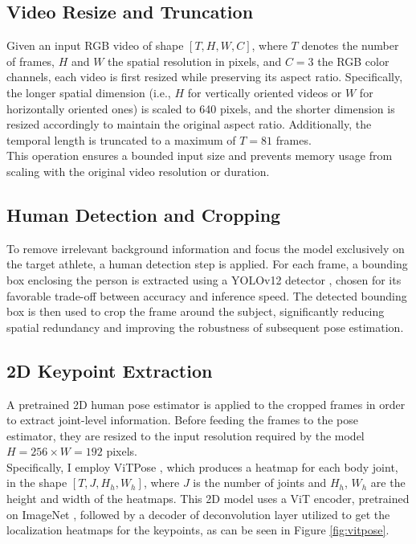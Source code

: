 \subsection{Video Resize and Truncation}
Given an input RGB video of shape $[T, H, W, C]$, where $T$ denotes the number of frames, $H$ and $W$ the spatial resolution in pixels, and $C=3$ the RGB color channels, each video is first resized while 
preserving its aspect ratio. Specifically, the longer spatial dimension (i.e., $H$ for vertically oriented videos or $W$ for horizontally oriented ones) is scaled to 640 pixels, and the shorter dimension 
is resized accordingly to maintain the original aspect ratio.
Additionally, the temporal length is truncated to a maximum of $T = 81$ frames.\\
This operation ensures a bounded input size and prevents memory usage from scaling with the original video resolution or duration.

\subsection{Human Detection and Cropping}
To remove irrelevant background information and focus the model exclusively on the target athlete, a human detection step is applied.
For each frame, a bounding box enclosing the person is extracted using a YOLOv12 detector \cite{tian2025yolov12}, chosen for its favorable trade-off between accuracy and inference speed.
The detected bounding box is then used to crop the frame around the subject, significantly reducing spatial redundancy and improving the robustness of subsequent pose estimation.

\subsection{2D Keypoint Extraction}
A pretrained 2D human pose estimator is applied to the cropped frames in order to extract joint-level information. Before feeding the frames to the pose estimator, they are 
resized to the input resolution required by the model $H = 256 \times W = 192$ pixels.\\
Specifically, I employ ViTPose \cite{xu2022vitpose}, which produces a heatmap for each body joint, in the shape $[T, J, H_h, W_h]$, where $J$ is the number of joints 
and $H_h$, $W_h$ are the height and width of the heatmaps. This 2D model uses a ViT \cite{dosovitskiy2020image} encoder, pretrained on ImageNet \cite{deng2009imagenet}, followed by a decoder of deconvolution layer utilized to
get the localization heatmaps for the keypoints, as can be seen in Figure \ref{fig:vitpose}.

